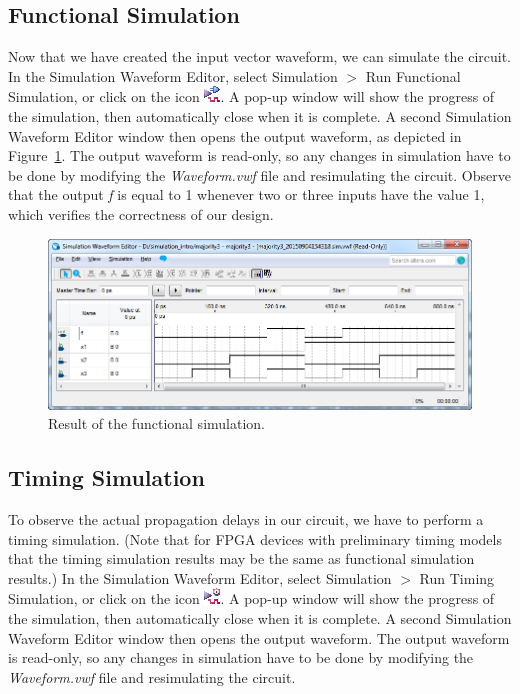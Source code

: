 \documentclass[11pt, twoside, pdftex]{article}
\begin{document}
\subsection{Functional Simulation}

Now that we have created the input vector waveform, we can simulate the circuit. 
In the Simulation Waveform Editor, select {\sf Simulation $>$ Run Functional Simulation},
or click on the icon \hbox{\includegraphics[scale=0.8]{figures/icon6.png}}. A pop-up window 
will show the progress of the simulation, then automatically close when it is complete. A 
second Simulation Waveform Editor window then opens the output waveform, as depicted in 
Figure~\ref{fig:17}. The output waveform is read-only, so any changes in simulation have 
to be done by modifying the {\it Waveform.vwf} file and resimulating the circuit.
Observe that the output {\it f} is equal to 1 whenever two or three inputs have 
the value 1, which verifies the correctness of our design.
~\\

\begin{figure}[H]
   \begin{center}
      \includegraphics[scale=0.65]{figures/figure17.png}
   \caption{Result of the functional simulation.} 
	 \label{fig:17}
	 \end{center}
\end{figure}

\subsection{Timing Simulation}

To observe the actual propagation delays in our circuit, we have to perform a timing simulation.
(Note that for FPGA devices with preliminary timing models that the timing simulation results
may be the same as functional simulation results.)
In the Simulation Waveform Editor, select {\sf Simulation $>$ Run Timing Simulation},
or click on the icon \hbox{\includegraphics[scale=0.9]{figures/icon7.png}}. A pop-up window 
will show the progress of the simulation, then automatically close when it is complete. A 
second Simulation Waveform Editor window then opens the output waveform. The output waveform 
is read-only, so any changes in simulation have to be done by modifying the {\it Waveform.vwf}
file and resimulating the circuit.
~\\
\end{document}
